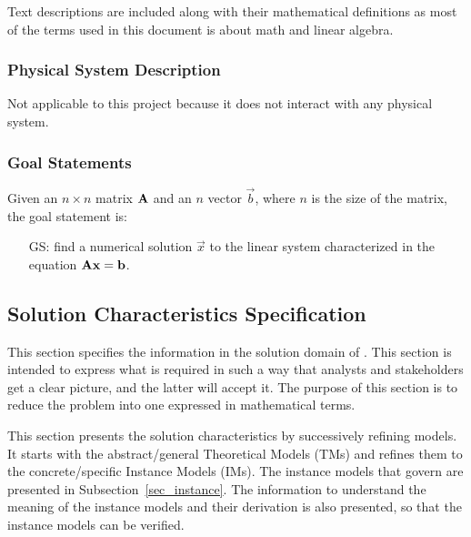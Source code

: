 \documentclass[12pt]{article}
\newcounter{goalnum} %
\begin{document}

Text descriptions are included along with their mathematical definitions as most
of the terms used in this document is about math and linear algebra.


\subsubsection{Physical System Description} \label{sec_phySystDescrip}

Not applicable to this project because it does not interact with any physical
system.

\subsubsection{Goal Statements}

\noindent Given an \(n \times n\) matrix \(\mathbf{A}\) and an \(n\) vector \(\vec{b}\),
where \(n\) is the size of the matrix, the goal statement is:

\begin{itemize}
\item[GS\refstepcounter{goalnum}\thegoalnum \label{GS:Axb}:] find a numerical
  solution \(\vec{x}\) to the linear system characterized in the equation
  \(\mathbf{A}\mathbf{x} = \mathbf{b}\).
\end{itemize}

\subsection{Solution Characteristics Specification}

This section specifies the information in the solution domain of \progname. This
section is intended to express what is required in such a way that analysts and
stakeholders get a clear picture, and the latter will accept it. The purpose of
this section is to reduce the problem into one expressed in mathematical terms.

This section presents the solution characteristics by successively refining
models. It starts with the abstract/general Theoretical Models (TMs) and refines
them to the concrete/specific Instance Models (IMs). The instance models that
govern \progname are presented in Subsection~\ref{sec_instance}. The
information to understand the meaning of the instance models and their
derivation is also presented, so that the instance models can be verified.
\end{document}
